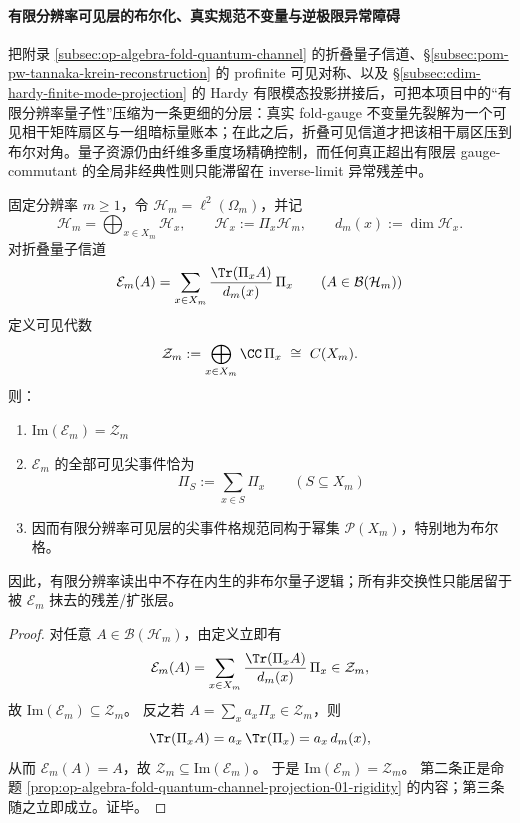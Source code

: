 \paragraph{有限分辨率可见层的布尔化、真实规范不变量与逆极限异常障碍}
把附录 \ref{subsec:op-algebra-fold-quantum-channel} 的折叠量子信道、\S\ref{subsec:pom-pw-tannaka-krein-reconstruction} 的 profinite 可见对称、以及 \S\ref{subsec:cdim-hardy-finite-mode-projection} 的 Hardy 有限模态投影拼接后，可把本项目中的“有限分辨率量子性”压缩为一条更细的分层：真实 fold-gauge 不变量先裂解为一个可见相干矩阵扇区与一组暗标量账本；在此之后，折叠可见信道才把该相干扇区压到布尔对角。量子资源仍由纤维多重度场精确控制，而任何真正超出有限层 gauge-commutant 的全局非经典性则只能滞留在 inverse-limit 异常残差中。

\begin{theorem}[有限分辨率可见层的布尔化与量子性的残差外置]\label{thm:conclusion-fold-quantum-visible-booleanization}
固定分辨率 \(m\ge 1\)，令 \(\mathcal H_m=\ell^2(\Omega_m)\)，并记
\[
\mathcal H_m=\bigoplus_{x\in X_m}\mathcal H_x,
\qquad
\mathcal H_x:=\Pi_x\mathcal H_m,
\qquad
d_m(x):=\dim \mathcal H_x.
\]
对折叠量子信道
\[
\mathcal E_m(A)=\sum_{x\in X_m}\frac{\Tr(\Pi_xA)}{d_m(x)}\,\Pi_x
\qquad (A\in\mathcal B(\mathcal H_m))
\]
定义可见代数
\[
\mathcal Z_m:=\bigoplus_{x\in X_m}\CC\,\Pi_x\ \cong\ C(X_m).
\]
则：
\begin{enumerate}
  \item \(\mathrm{Im}(\mathcal E_m)=\mathcal Z_m\)
  \item \(\mathcal E_m\) 的全部可见尖事件恰为
  \[
  \Pi_S:=\sum_{x\in S}\Pi_x
  \qquad (S\subseteq X_m)
  \]
  \item 因而有限分辨率可见层的尖事件格规范同构于幂集 \(\mathcal P(X_m)\)，特别地为布尔格。
\end{enumerate}
因此，有限分辨率读出中不存在内生的非布尔量子逻辑；所有非交换性只能居留于被 \(\mathcal E_m\) 抹去的残差/扩张层。
\end{theorem}
\begin{proof}
对任意 \(A\in\mathcal B(\mathcal H_m)\)，由定义立即有
\[
\mathcal E_m(A)=\sum_{x\in X_m}\frac{\Tr(\Pi_xA)}{d_m(x)}\,\Pi_x\in \mathcal Z_m,
\]
故 \(\mathrm{Im}(\mathcal E_m)\subseteq \mathcal Z_m\)。
反之若 \(A=\sum_x a_x\Pi_x\in\mathcal Z_m\)，则
\[
\Tr(\Pi_xA)=a_x\,\Tr(\Pi_x)=a_x\,d_m(x),
\]
从而 \(\mathcal E_m(A)=A\)，故 \(\mathcal Z_m\subseteq \mathrm{Im}(\mathcal E_m)\)。
于是 \(\mathrm{Im}(\mathcal E_m)=\mathcal Z_m\)。
第二条正是命题 \ref{prop:op-algebra-fold-quantum-channel-projection-01-rigidity} 的内容；第三条随之立即成立。证毕。
\end{proof}

